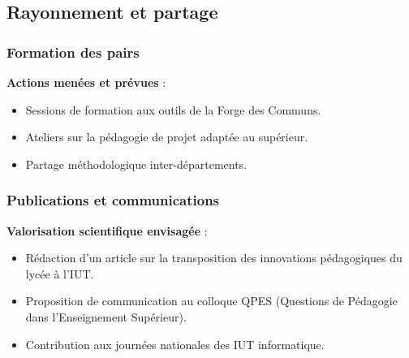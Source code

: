 \subsection{Rayonnement et partage}

\subsubsection{Formation des pairs}

\textbf{Actions menées et prévues} :
\begin{itemize}[leftmargin=*]
    \item Sessions de formation aux outils de la Forge des Communs.
    \item Ateliers sur la pédagogie de projet adaptée au supérieur.
    \item Partage méthodologique inter-départements.
\end{itemize}

\subsubsection{Publications et communications}

\textbf{Valorisation scientifique envisagée} :
\begin{itemize}[leftmargin=*]
    \item Rédaction d'un article sur la transposition des innovations pédagogiques du lycée à l'IUT.
    \item Proposition de communication au colloque QPES (Questions de Pédagogie dans l'Enseignement Supérieur).
    \item Contribution aux journées nationales des IUT informatique.
\end{itemize}
